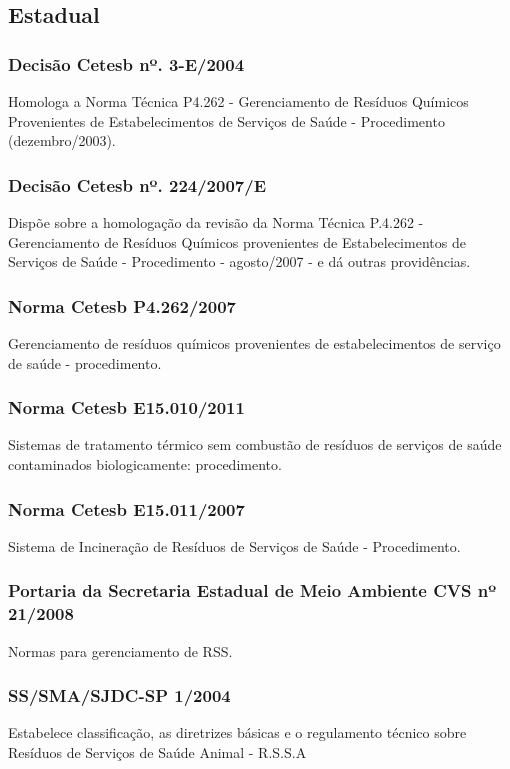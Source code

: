 \begin{subapend}
	\subsection{Estadual}
	\begin{subsubapend}
		\item \subsubsection{Decisão Cetesb nº. 3-E/2004}
		Homologa a Norma Técnica P4.262 - Gerenciamento de Resíduos Químicos Provenientes de Estabelecimentos de Serviços de Saúde - Procedimento (dezembro/2003).
		\subsubsection{Decisão Cetesb nº. 224/2007/E}
		Dispõe sobre a homologação da revisão da Norma Técnica P.4.262 - Gerenciamento de Resíduos Químicos provenientes de Estabelecimentos de Serviços de Saúde - Procedimento - agosto/2007 - e dá outras providências.
		\subsubsection{Norma Cetesb P4.262/2007}
		Gerenciamento de resíduos químicos provenientes de estabelecimentos de serviço de saúde - procedimento.
		\subsubsection{Norma Cetesb E15.010/2011}
		Sistemas de tratamento térmico sem combustão de resíduos de serviços de saúde contaminados biologicamente: procedimento.
		\subsubsection{Norma Cetesb E15.011/2007}
		Sistema de Incineração de Resíduos de Serviços de Saúde - Procedimento.
		\subsubsection{Portaria da Secretaria Estadual de Meio Ambiente  CVS nº 21/2008}
		Normas para gerenciamento de RSS.
		\subsubsection{SS/SMA/SJDC-SP 1/2004}
		Estabelece classificação, as diretrizes básicas e o regulamento técnico sobre Resíduos de Serviços de Saúde Animal - R.S.S.A

\end{subsubapend}
\end{subapend}
